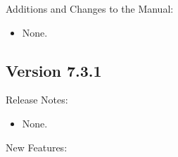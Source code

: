 \noindent Additions and Changes to the Manual:

\begin{itemize}

\item None.

\end{itemize}


\subsection*{\label{sec:New-7-3-1}Version 7.3.1}

\noindent Release Notes:

\begin{itemize}

\item None.

\end{itemize}


\noindent New Features:

